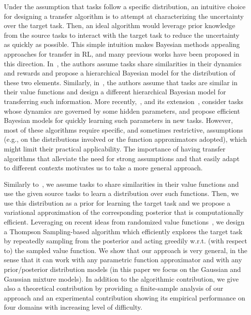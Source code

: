 \documentclass{article}
\begin{document}
Under the assumption that tasks follow a specific distribution, an intuitive choice for designing a transfer algorithm is to attempt at characterizing the uncertainty over the target task. Then, an ideal algorithm would leverage prior knowledge from the source tasks to interact with the target task to reduce the uncertainty as quickly as possible. This simple intuition makes Bayesian  methods appealing approaches for transfer in RL, and many previous works have been proposed in this direction. In~\cite{wilson2007multi}, the authors assume tasks share similarities in their dynamics and rewards and propose a hierarchical Bayesian model for the distribution of these two elements. Similarly, in~\cite{lazaric2010bayesian}, the authors assume that tasks are similar in their value functions and design a different hierarchical Bayesian model for transferring such information. More recently,~\cite{doshi2016hidden}, and its extension~\cite{killian2017robust}, consider tasks whose dynamics are governed by some hidden parameters, and propose efficient Bayesian models for quickly learning such parameters in new tasks. However, most of these algorithms require specific, and sometimes restrictive, assumptions (e.g., on the distributions involved or the function approximators adopted), which might limit their practical applicability. The importance of having transfer algorithms that alleviate the need for strong assumptions and that easily adapt to different contexts motivates us to take a more general approach.

Similarly to~\cite{lazaric2010bayesian}, we assume tasks to share similarities in their value functions and use the given source tasks to learn a distribution over such functions. Then, we use this distribution as a prior for learning the target task and we propose a variational approximation of the corresponding posterior that is computationally efficient. Leveraging on recent ideas from randomized value functions~\cite{osband2014generalization}, we design a Thompson Sampling-based algorithm which efficiently explores the target task by repeatedly sampling from the posterior and acting greedily w.r.t. (with respect to) the sampled value function. We show that our approach is very general, in the sense that it can work with any parametric function approximator and with any prior/posterior distribution models (in this paper we focus on the Gaussian and Gaussian mixture models). In addition to the algorithmic contribution, we give also a theoretical contribution by providing a finite-sample analysis of our approach and an experimental contribution showing its empirical performance on four domains with increasing level of difficulty.
\end{document}
